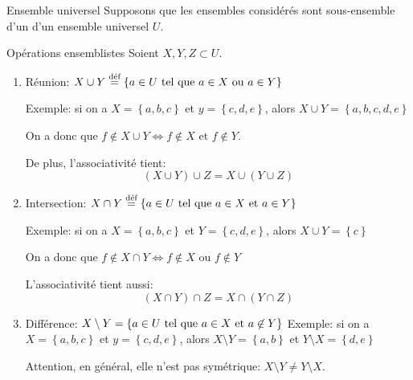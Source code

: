 \documentclass{article}
\begin{document}
\begin{parag}{Ensemble universel}
        Supposons que les ensembles considérés sont sous-ensemble d'un d'un ensemble universel $U$.

    \begin{subparag}{Opérations ensemblistes}
        Soient $X, Y, Z \subset U$.
        \begin{enumerate}
            \item Réunion: $X \cup Y \over{=}{\text{déf}} \left\{a \in U \telque a \in X \text{ ou } a \in Y\right\}$

              Exemple: si on a $X = \left\{a, b, c\right\}$ et $y = \left\{c, d, e\right\}$, alors $X \cup Y = \left\{a, b, c, d, e\right\}$

            On a donc que $f \not \in X \cup Y \iff f \not \in X \text{ et } f \not\in Y$.

            De plus, l'associativité tient:
            \[\left(X \cup Y\right) \cup Z = X \cup \left(Y \cup Z\right)\]

        \item Intersection: $X \cap Y \over{=}{\text{déf}} \left\{a \in U \telque a \in X \text{ et } a \in Y\right\}$

           Exemple: si on a $X = \left\{a, b, c\right\}$ et $Y = \left\{c, d, e\right\}$, alors $X \cup Y = \left\{c\right\}$

           On a donc que $f \not\in X \cap Y \iff f \not\in X \text{ ou } f \not \in Y$

            L'associativité tient aussi:
            \[\left(X \cap Y\right) \cap Z = X \cap \left(Y \cap Z\right)\]
            \item Différence: $X \setminus Y = \left\{a \in U \telque a \in X \text{ et } a \not \in Y\right\}$
              Exemple: si on a $X = \left\{a, b, c\right\}$ et $y = \left\{c, d, e\right\}$, alors $X \setminus Y = \left\{a, b\right\}$ et $Y \setminus X = \left\{d, e\right\}$

              Attention, en général, elle n'est pas symétrique: $X \setminus Y \neq Y \setminus X$.
        \end{enumerate}
    \end{subparag}
\end{parag}
\end{document}
